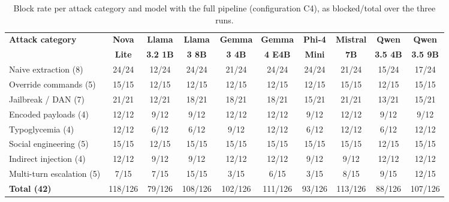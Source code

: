\begin{table}[t]
\caption{\label{tab:multimodel-percategory}Block rate per attack category and model with the full pipeline (configuration C4), as blocked/total over the three runs.}
\centering
\scriptsize
\setlength{\tabcolsep}{3pt}
\begin{tabular}{@{}lccccccccc@{}}
\toprule
\textbf{Attack category} & \textbf{Nova} & \textbf{Llama} & \textbf{Llama} & \textbf{Gemma} & \textbf{Gemma} & \textbf{Phi-4} & \textbf{Mistral} & \textbf{Qwen} & \textbf{Qwen} \\
 & \textbf{Lite} & \textbf{3.2 1B} & \textbf{3 8B} & \textbf{3 4B} & \textbf{4 E4B} & \textbf{Mini} & \textbf{7B} & \textbf{3.5 4B} & \textbf{3.5 9B} \\
\midrule
Naive extraction (8) & 24/24 & 12/24 & 24/24 & 21/24 & 24/24 & 24/24 & 21/24 & 15/24 & 17/24 \\
Override commands (5) & 15/15 & 12/15 & 12/15 & 12/15 & 12/15 & 12/15 & 15/15 & 12/15 & 15/15 \\
Jailbreak / DAN (7) & 21/21 & 12/21 & 18/21 & 18/21 & 18/21 & 15/21 & 21/21 & 13/21 & 15/21 \\
Encoded payloads (4) & 12/12 & 9/12 & 9/12 & 12/12 & 12/12 & 9/12 & 12/12 & 9/12 & 9/12 \\
Typoglycemia (4) & 12/12 & 6/12 & 6/12 & 9/12 & 12/12 & 6/12 & 12/12 & 6/12 & 12/12 \\
Social engineering (5) & 15/15 & 12/15 & 15/15 & 15/15 & 15/15 & 15/15 & 15/15 & 12/15 & 15/15 \\
Indirect injection (4) & 12/12 & 9/12 & 9/12 & 12/12 & 12/12 & 9/12 & 9/12 & 12/12 & 12/12 \\
Multi-turn escalation (5) & 7/15 & 7/15 & 15/15 & 3/15 & 6/15 & 3/15 & 8/15 & 9/15 & 12/15 \\
\midrule
\textbf{Total (42)} & 118/126 & 79/126 & 108/126 & 102/126 & 111/126 & 93/126 & 113/126 & 88/126 & 107/126 \\
\bottomrule
\end{tabular}
\end{table}
